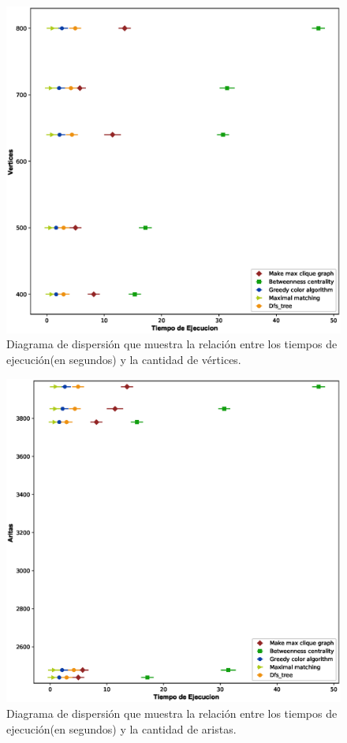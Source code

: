 \documentclass{article}
\begin{document}
\begin{center}
\begin{figure}[htbp]
\includegraphics[scale=0.7]{DiagramVertices.eps}
\caption{Diagrama de dispersión que muestra la relación entre los tiempos de ejecución(en segundos) y la cantidad de vértices.}
\end{figure}
\begin{figure}[htbp]
\includegraphics[scale=0.7]{DiagramAristas.eps}
\caption{Diagrama de dispersión que muestra la relación entre los tiempos de ejecución(en segundos) y la cantidad de aristas.}
\end{figure}
 \end{center}





\end{document}
